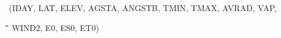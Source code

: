 \documentclass[11pt]{article}
\begin{document}
\begin{indenting}{3.81cm}
(IDAY, LAT, ELEV, AGSTA, ANGSTB, TMIN, TMAX, AVRAD, VAP,
\end{indenting}
\begin{tabbing}
\hspace{1.27cm}\=\hspace{1.27cm}\=\hspace{1.27cm}\=\hspace{1.27cm}\=%
\hspace{1.27cm}\=\hspace{1.27cm}\=\hspace{1.27cm}\=\hspace{1.27cm}\=%
\hspace{1.27cm}\=\hspace{1.27cm}\=\kill
 \>\> \> \>  WIND2, E0, ES0, ET0)
\end{tabbing}
\nwln
\end{document}
